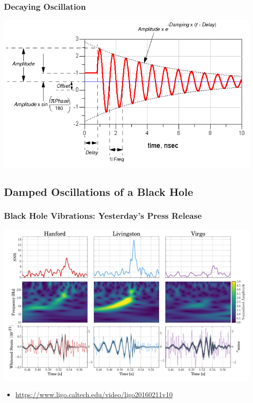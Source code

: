 \documentclass[pdf,hideothersubsections]{beamer}
\begin{document}
\begin{frame}
\frametitle{Decaying Oscillation}

\centering
\includegraphics[width=\textwidth]{damped_sine.png}

\end{frame}


\subsection{Damped Oscillations of a Black Hole}
\begin{frame}
\frametitle{Black Hole Vibrations: Yesterday's Press Release}
\centering
\includegraphics[width=\textwidth]{GW170814-TF.jpg}

\begin{itemize}
   \item \url{https://www.ligo.caltech.edu/video/ligo20160211v10}
\end{itemize}
\end{frame}
\end{document}
